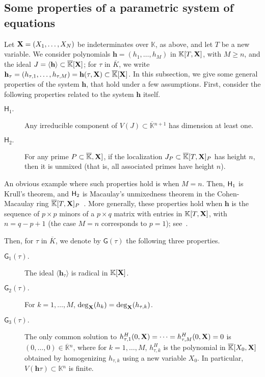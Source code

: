 \documentclass[11pt]{article}
\numberwithin{Property}{section}
\numberwithin{Theorem}{section}
\numberwithin{Proposition}{section}
\numberwithin{Lemma}{section}
\numberwithin{Corollary}{section}
\numberwithin{Definition}{section}
\numberwithin{Remark}{section}
\numberwithin{Conjecture}{section}
\numberwithin{Problem}{section}
\numberwithin{Claim}{section}
\theoremstyle{definition}
\numberwithin{Example}{section}
\def\h {\ensuremath{\mathbf{h}}}
\renewcommand{\ge}{\geqslant}
\def\bar{\overline}
\renewcommand{\ge}{\geqslant} %
\newcommand{\field}{\mathbb{K}} %
\newcommand{\mat}[1]{\mathbf{\MakeUppercase{#1}}} %
\begin{document}
\subsection{Some properties of a parametric system of equations}
Let $\mat{X}=(X_1,\dots,X_N)$ be indeterminates over $\field$, as above, and let $T$ be a new variable. We consider polynomials $\mathbf{h}=(h_1,\dots,h_M)$ in $\field[T,\mat{X}]$, with $M \ge n$, and the ideal $J=\langle \mathbf{h} \rangle \subset \bar{\field}[\mat{X}]$; for $\tau$ in $\bar{K}$, we write $\mathbf{h}_\tau=(h_{\tau,1},\dots,h_{\tau,M})=\mathbf{h}(\tau,\mat{X})\subset \bar{\field}[\mat{X}]$. %
In this subsection, we give some general properties of the system $\mathbf{h}$, that hold under a few assumptions.  First, consider
the following properties related to the system $\mathbf{h}$ itself.
\begin{description}
\item[$\mathsf{H}_1.$] Any irreducible component of $V(J) \subset
  \bar{\field}{}^{n+1}$ has dimension at least one.
\item[$\mathsf{H}_2.$] For any prime $P \subset\bar{\field},\mat{X}]$, if the
  localization $J_P \subset \bar{\field}[T,\mat{X}]_P$ has height $n$, then it is
  unmixed (that is, all associated primes have height $n$).
\end{description}

An obvious example where such properties hold is when $M=n$. Then, ${\sf H}_1$ is Krull's theorem, and ${\sf H}_2$ is Macaulay's unmixedness theorem in the Cohen-Macaulay ring $\bar{\field}[T,\mat{X}]_P$~\cite[Corollary~18.14]{Eisenbud95}. More generally, these properties hold when $\h$ is the sequence of $p \times p$ minors of a $p \times q$ matrix with entries in $\field[T,\mat{X}]$, with $n=q-p+1$ (the case $M=n$ corresponds to $p=1$); see~\cite[Section~6]{Eagon188}.

Then, for $\tau$ in $\bar{K}$, we denote by $\mathsf{G}(\tau)$ the following three properties.
\begin{description}
\item[$\mathsf{G}_1(\tau).$] The ideal $\langle \mathbf{h}_\tau \rangle$ is radical in $\field[\mat{X}]$.
\item[$\mathsf{G}_2(\tau).$] For $k=1,\dots,M$,
  $\deg_\mat{X}(h_k)=\deg_\mat{X}(h_{\tau,k})$.
\item[$\mathsf{G}_3(\tau).$] The only common solution to $h_{\tau,1}^H(0,\mat{X})=\cdots=h_{\tau,M}^H(0,\mat{X})=0$ is $(0,\dots,0)\in \bar{\field}{}^n$, where for $k=1,\dots,M$, $h_{\tau,k}^H$ is the polynomial in $\bar{\field}[X_0,\mat{X}]$ obtained by homogenizing $h_{\tau,k}$ using a new variable $X_0$. In particular, $V(\mathbf{h}\tau) \subset \field{}^n$ is finite.
\end{description}
\end{document}
